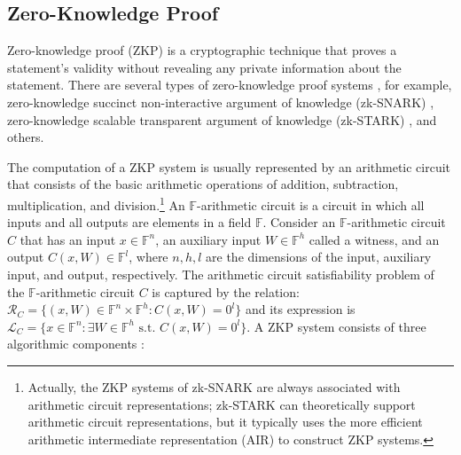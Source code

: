 \documentclass[journal]{IEEEtran}
\begin{document}
\subsection{Zero-Knowledge Proof}\label{ss:2b}
Zero-knowledge proof (ZKP) is a cryptographic technique that proves a statement's validity without revealing any private information about the statement. There are several types of zero-knowledge proof systems \cite{canetti2000resettable}, for example, zero-knowledge succinct non-interactive argument of knowledge (zk-SNARK) \cite{sasson2014zerocash}, zero-knowledge scalable transparent argument of knowledge (zk-STARK) \cite{ben2019scalable}, and others. 



The computation of a ZKP system is usually represented by an arithmetic circuit that consists of the basic arithmetic operations of addition, subtraction, multiplication, and division.\footnote{Actually, the ZKP systems of zk-SNARK are always associated with arithmetic circuit representations; zk-STARK can theoretically support arithmetic circuit representations, but it typically uses the more efficient arithmetic intermediate representation (AIR) \cite{ben2018scalable} to construct ZKP systems.} An \(\mathbb{F}\)-arithmetic circuit is a circuit in which all inputs and all outputs are elements in a field \(\mathbb{F}\). Consider an \(\mathbb{F}\)-arithmetic circuit \(C\) that has an input \(x \in \mathbb{F}^n\), an auxiliary input \(W \in \mathbb{F}^h\) called a witness, and an output \(C(x,W) \in \mathbb{F}^l\), where \(n, h, l\) are the dimensions of the input, auxiliary input, and output, respectively. The arithmetic circuit satisfiability problem of the \(\mathbb{F}\)-arithmetic circuit \(C\) is captured by the relation: $\mathcal{R}_C = \{(x,W) \in \mathbb{F}^n \times \mathbb{F}^h : C(x,W) = 0^l\}$ and its expression is \(\mathcal{L}_C = \{x \in \mathbb{F}^n: \exists W \in \mathbb{F}^h \text{ s.t. } C(x,W) = 0^l\}\). A ZKP system consists of three algorithmic components \cite{sasson2014zerocash}:
\end{document}
